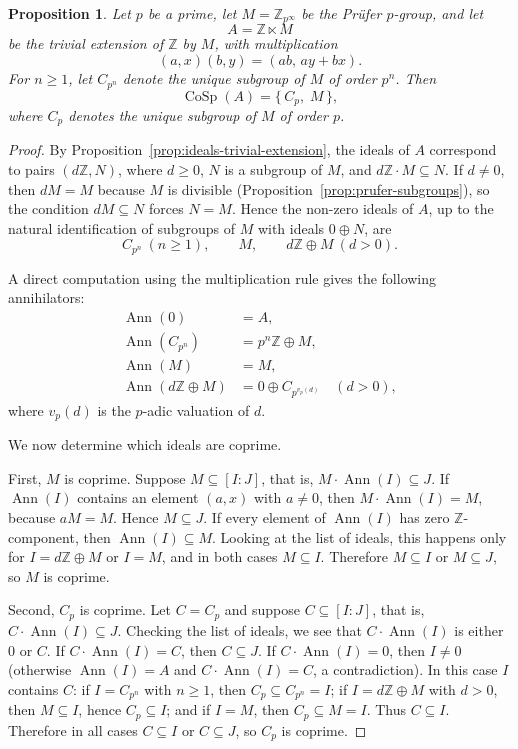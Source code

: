 \documentclass{amsart}
\newtheorem{proposition}{Proposition}
\DeclareMathOperator{\ann}{Ann}
\begin{document}
\begin{proposition}\label{prop:cosp-trivial-extension}
Let $p$ be a prime, let $M=\mathbb Z_{p^\infty}$ be the Pr\"ufer $p$-group, and let
\[
A=\mathbb Z\ltimes M
\]
be the trivial extension of $\mathbb Z$ by $M$, with multiplication
\[
(a,x)(b,y)=(ab,\,ay+bx).
\]
For $n\ge 1$, let $C_{p^n}$ denote the unique subgroup of $M$ of order $p^n$. Then
\[
\operatorname{CoSp}(A)=\{\,C_p,\;M\,\},
\]
where $C_p$ denotes the unique subgroup of $M$ of order $p$.
\end{proposition}

\begin{proof}
By Proposition~\ref{prop:ideals-trivial-extension}, the ideals of $A$ correspond to pairs $(d\mathbb Z,N)$, where $d\ge 0$, $N$ is a subgroup of $M$, and $d\mathbb Z\cdot M\subseteq N$. If $d\neq 0$, then $dM=M$ because $M$ is divisible (Proposition~\ref{prop:prufer-subgroups}), so the condition $dM\subseteq N$ forces $N=M$. Hence the non-zero ideals of $A$, up to the natural identification of subgroups of $M$ with ideals $0\oplus N$, are
\[
C_{p^n}\ (n\ge 1),\qquad M,\qquad d\mathbb Z\oplus M\ (d>0).
\]

A direct computation using the multiplication rule gives the following annihilators:
\[
\begin{aligned}
\ann(0)&=A,\\
\ann(C_{p^n})&=p^n\mathbb Z\oplus M,\\
\ann(M)&=M,\\
\ann(d\mathbb Z\oplus M)&=0\oplus C_{p^{v_p(d)}}\quad (d>0),
\end{aligned}
\]
where $v_p(d)$ is the $p$-adic valuation of $d$.

We now determine which ideals are coprime.

First, $M$ is coprime. Suppose $M\subseteq [I:J]$, that is, $M\cdot\ann(I)\subseteq J$. If $\ann(I)$ contains an element $(a,x)$ with $a\neq 0$, then $M\cdot\ann(I)=M$, because $aM=M$. Hence $M\subseteq J$. If every element of $\ann(I)$ has zero $\mathbb Z$-component, then $\ann(I)\subseteq M$. Looking at the list of ideals, this happens only for $I=d\mathbb Z\oplus M$ or $I=M$, and in both cases $M\subseteq I$. Therefore $M\subseteq I$ or $M\subseteq J$, so $M$ is coprime.

Second, $C_p$ is coprime. Let $C=C_p$ and suppose $C\subseteq [I:J]$, that is, $C\cdot\ann(I)\subseteq J$. Checking the list of ideals, we see that $C\cdot\ann(I)$ is either $0$ or $C$. If $C\cdot\ann(I)=C$, then $C\subseteq J$. If $C\cdot\ann(I)=0$, then $I\neq 0$ (otherwise $\ann(I)=A$ and $C\cdot\ann(I)=C$, a contradiction). In this case $I$ contains $C$: if $I=C_{p^n}$ with $n\ge 1$, then $C_p\subseteq C_{p^n}=I$; if $I=d\mathbb Z\oplus M$ with $d>0$, then $M\subseteq I$, hence $C_p\subseteq I$; and if $I=M$, then $C_p\subseteq M=I$. Thus $C\subseteq I$. Therefore in all cases $C\subseteq I$ or $C\subseteq J$, so $C_p$ is coprime.


\end{proof}
\end{document}
